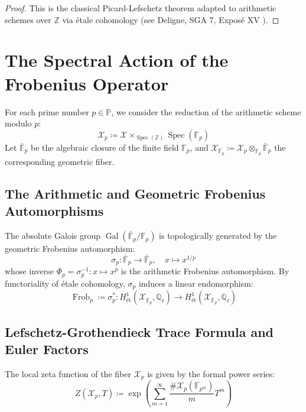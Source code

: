 \documentclass[11pt,a4paper]{article}
\theoremstyle{definition}
\begin{document}
\begin{proof}
This is the classical Picard-Lefschetz theorem adapted to arithmetic schemes over $\mathbb{Z}$ via étale cohomology (see Deligne, SGA 7, Exposé XV \cite{sga7}).
\end{proof}

\newpage

\section{The Spectral Action of the Frobenius Operator}
For each prime number $p \in \mathbb{P}$, we consider the reduction of the arithmetic scheme modulo $p$:
\begin{equation}
\mathcal{X}_p \coloneqq \mathcal{X} \times_{\operatorname{Spec}(\mathbb{Z})} \operatorname{Spec}(\mathbb{F}_p)
\end{equation}
Let $\bar{\mathbb{F}}_p$ be the algebraic closure of the finite field $\mathbb{F}_p$, and $\mathcal{X}_{\bar{\mathbb{F}}_p} \coloneqq \mathcal{X}_p \otimes_{\mathbb{F}_p} \bar{\mathbb{F}}_p$ the corresponding geometric fiber.

\subsection{The Arithmetic and Geometric Frobenius Automorphisms}
The absolute Galois group $\operatorname{Gal}(\bar{\mathbb{F}}_p / \mathbb{F}_p)$ is topologically generated by the geometric Frobenius automorphism:
\begin{equation}
\sigma_p : \bar{\mathbb{F}}_p \longrightarrow \bar{\mathbb{F}}_p, \quad x \mapsto x^{1/p}
\end{equation}
whose inverse $\Phi_p = \sigma_p^{-1} : x \mapsto x^p$ is the arithmetic Frobenius automorphism.
By functoriality of étale cohomology, $\sigma_p$ induces a linear endomorphism:
\begin{equation}
\operatorname{Frob}_p \coloneqq \sigma_p^* : H^1_{\text{ét}}(\mathcal{X}_{\bar{\mathbb{F}}_p}, \mathbb{Q}_\ell) \longrightarrow H^1_{\text{ét}}(\mathcal{X}_{\bar{\mathbb{F}}_p}, \mathbb{Q}_\ell)
\end{equation}

\subsection{Lefschetz-Grothendieck Trace Formula and Euler Factors}
The local zeta function of the fiber $\mathcal{X}_p$ is given by the formal power series:
\begin{equation}
Z(\mathcal{X}_p, T) \coloneqq \exp\left( \sum_{m=1}^\infty \frac{\# \mathcal{X}_p(\mathbb{F}_{p^m})}{m} T^m \right)
\end{equation}
\end{document}

